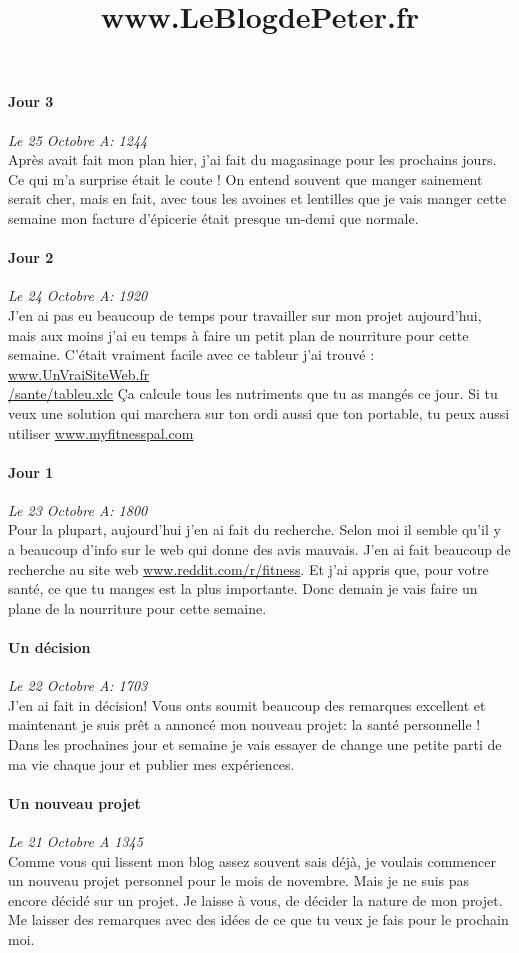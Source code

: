 \documentclass{article}
\begin{document}
\title{www.LeBlogdePeter.fr}


\paragraph{Jour 3} \emph{Le 25 Octobre A: 1244}\\
Après avait fait mon plan hier, j'ai fait du magasinage pour les prochains jours. Ce qui m'a surprise était le coute ! On entend souvent que manger sainement serait cher, mais en fait, avec tous les avoines et lentilles que je vais manger cette semaine mon facture d'épicerie était presque un-demi que normale.

\paragraph{Jour 2} \emph{Le 24 Octobre A: 1920}\\
J'en ai pas eu beaucoup de temps pour travailler sur mon projet aujourd'hui, mais aux moins j'ai eu temps à faire un petit plan de nourriture
pour cette semaine. C'était vraiment facile avec ce tableur j'ai trouvé : {\color{blue}\underline{www.UnVraiSiteWeb.fr}}\\ {\color{blue}\underline{/sante/tableu.xlc}}  Ça calcule tous les nutriments que tu as mangés ce jour. Si tu veux une solution qui marchera sur ton ordi aussi que ton portable, tu peux aussi utiliser {\color{blue}\underline{www.myfitnesspal.com}}

\paragraph{Jour 1} \emph{Le 23 Octobre A: 1800}\\
Pour la plupart, aujourd'hui j'en ai fait du recherche. Selon moi il semble qu'il y a beaucoup d'info sur le web qui donne des avis mauvais. J'en ai fait beaucoup de recherche au site web {\color{blue}\underline{www.reddit.com/r/fitness}}. Et j'ai appris que, pour votre santé, ce que tu manges est la plus importante. Donc demain je vais faire un plane de la nourriture pour cette semaine.

\paragraph{Un décision} \emph{Le 22 Octobre A: 1703}\\
J'en ai fait in décision! Vous onts soumit beaucoup des remarques excellent et maintenant je suis prêt a annoncé mon nouveau projet: la santé personnelle ! Dans les prochaines jour et semaine je vais essayer de change une petite parti de ma vie chaque jour et publier mes expériences.

\paragraph{Un nouveau projet} \emph{Le 21 Octobre A 1345} \\
Comme vous qui lissent mon blog assez souvent sais déjà, je voulais commencer un nouveau projet personnel pour le mois de novembre. Mais je ne suis pas encore décidé sur un projet. Je laisse à vous, de décider la nature de mon projet. Me laisser des remarques avec des idées de ce que tu veux je fais pour le prochain moi.
\end{document}
